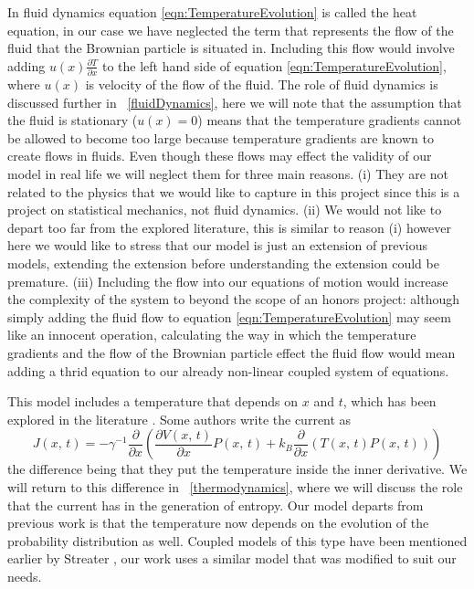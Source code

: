 In fluid dynamics equation \ref{eqn:TemperatureEvolution} is called the heat equation, in our case we have neglected the term that represents the flow of the fluid that the Brownian particle is situated in. Including this flow would involve adding $u(x) \frac{\partial T}{\partial x}$ to the left hand side of equation \ref{eqn:TemperatureEvolution}, where $u(x)$ is velocity of the flow of the fluid. The role of fluid dynamics is discussed further in ~\autoref{fluidDynamics}, here we will note that the assumption that the fluid is stationary ($u(x) = 0$) means that the temperature gradients cannot be allowed to become too large because temperature gradients are known to create flows in fluids. Even though these flows may effect the validity of our model in real life we will neglect them for three main reasons. (i) They are not related to the physics that we would like to capture in this project since this is a project on statistical mechanics, not fluid dynamics. (ii) We would not like to depart too far from the explored literature, this is similar to reason (i) however here we would like to stress that our model is just an extension of previous models, extending the extension before understanding the extension could be premature. (iii) Including the flow into our equations of motion would increase the complexity of the system to beyond the scope of an honors project: although simply adding the fluid flow to equation \ref{eqn:TemperatureEvolution} may seem like an innocent operation, calculating the way in which the temperature gradients and the flow of the Brownian particle effect the fluid flow would mean adding a thrid equation to our already non-linear coupled system of equations.

This model includes a temperature that depends on $x$ and $t$, which has been explored in the literature \cite{Kramers1940}. Some authors write the current as \cite{Kramers1940,Kampen1988}
\begin{equation}
J(x, \, t) = -\gamma^{-1} \frac{\partial}{\partial x} \left (\frac{\partial V(x, \, t)}{\partial x} P(x, \, t) + k_B \frac{\partial}{\partial x}(T(x, \, t) P(x, \, t)) \right )
\end{equation}
the difference being that they put the temperature inside the inner derivative. We will return to this difference in ~\autoref{thermodynamics}, where we will discuss the role that the current has in the generation of entropy.
Our model departs from previous work is that the temperature now depends on the evolution of the probability distribution as well. Coupled models of this type have been mentioned earlier by Streater \cite{Streater1997, Streater1997a,Streater2000,Streater1997b}, our work uses a similar model that was modified to suit our needs.


